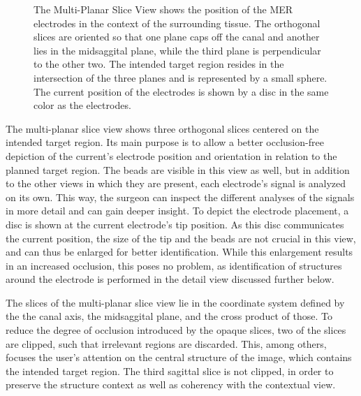 \documentclass[journal]{vgtc}                %
\begin{document}
\begin{figure}[t]
    \centering
    \caption{The Multi-Planar Slice View shows the position of the MER electrodes in the context of the surrounding tissue. The orthogonal slices are oriented so that one plane caps off the canal and another lies in the midsaggital plane, while the third plane is perpendicular to the other two. The intended target region resides in the intersection of the three planes and is represented by a small sphere. The current position of the electrodes is shown by a disc in the same color as the electrodes.}
    \label{fig:recordingphase:mpr}
\end{figure}

The multi-planar slice view shows three orthogonal slices centered on the intended target region. Its main purpose is to allow a better occlusion-free depiction of the current's electrode position and orientation in relation to the planned target region. The beads are visible in this view as well, but in addition to the other views in which they are present, each electrode's signal is analyzed on its own. This way, the surgeon can inspect the different analyses of the signals in more detail and can gain deeper insight. To depict the electrode placement, a disc is shown at the current electrode's tip position. As this disc communicates the current position, the size of the tip and the beads are not crucial in this view, and can thus be enlarged for better identification. While this enlargement results in an increased occlusion, this poses no problem, as identification of structures around the electrode is performed in the detail view discussed further below.

The slices of the multi-planar slice view lie in the coordinate system defined by the the canal axis, the midsaggital plane, and the cross product of those. To reduce the degree of occlusion introduced by the opaque slices, two of the slices are clipped, such that irrelevant regions are discarded. This, among others, focuses the user's attention on the central structure of the image, which contains the intended target region. The third sagittal slice is not clipped, in order to preserve the structure context as well as coherency with the contextual view.
\end{document}
